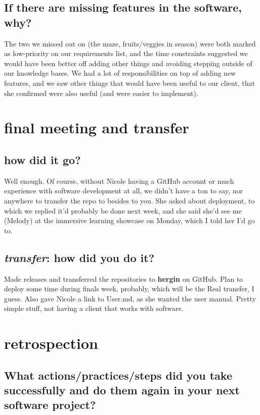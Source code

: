 \documentclass[12pt, letterpaper]{article}
\begin{document}
\subsection{If there are missing features in the software, why?}
	The two we missed out on (the maze, fruits/veggies in season) were both marked as low-priority on our requirements list, and the time constraints suggested we would have been better off adding other things and avoiding stepping outside of our knowledge bases. We had a lot of responsibilities on top of adding new features, and we saw other things that would have been useful to our client, that she confirmed were also useful (and were easier to implement).

\section{final meeting and transfer}
\subsection{how did it go?}
	Well enough. Of course, without Nicole having a GitHub account or much experience with software development at all, 
	we didn't have a ton to say, nor anywhere to transfer the repo to besides to you. She asked about deployment, to which 
	we replied it'd probably be done next week, and she said she'd see me (Melody) at the immersive learning showcase on Monday, 
	which I told her I'd go to.

\subsection{\emph{transfer}: how did you do it?}
	Made releases and transferred the repositories to \textbf{hergin} on GitHub. Plan to deploy some time during finals week, probably, 
	which will be the Real transfer, I guess. Also gave Nicole a link to User.md, as she wanted the user manual. Pretty simple stuff, 
	not having a client that works with software.

\section{retrospection}
\subsection{What actions/practices/steps did you take successfully and do them again in your next software project?}
\end{document}
